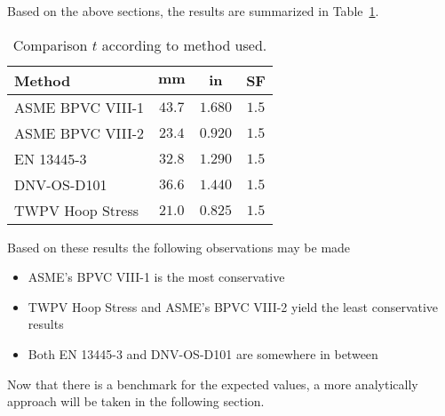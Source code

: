 Based on the above sections, the results are summarized in Table~\ref{table:2_comp}.
\begin{table}[H]
  \centering
  \caption{Comparison $t$ according to method used.}
    \begin{tabular}{lccc}
    \textbf{Method} & \textbf{$\mathbf{mm}$} & \textbf{$\mathbf{in}$} & \textbf{SF} \\
    \midrule
    ASME BPVC VIII-1 & $43.7$  & $1.680$ & $1.5$ \\
    ASME BPVC VIII-2 & $23.4$  & $0.920$ & $1.5$ \\
    EN 13445-3 & $32.8$  & $1.290$ & $1.5$ \\    
    DNV-OS-D101 & $36.6$  & $1.440$ & $1.5$ \\
    TWPV Hoop Stress & $21.0$ &$0.825$ & $1.5$\\
    \end{tabular}%
  \label{table:2_comp}%
\end{table}%

Based on these results the following observations may be made

\begin{itemize}
	\item ASME's BPVC VIII-1 is the most conservative
	\item TWPV Hoop Stress and ASME's BPVC VIII-2 yield the least conservative results
	\item Both EN 13445-3  and DNV-OS-D101 are somewhere in between \\
\end{itemize}

Now that there is a benchmark for the expected values, a more analytically approach will be taken in the following section.